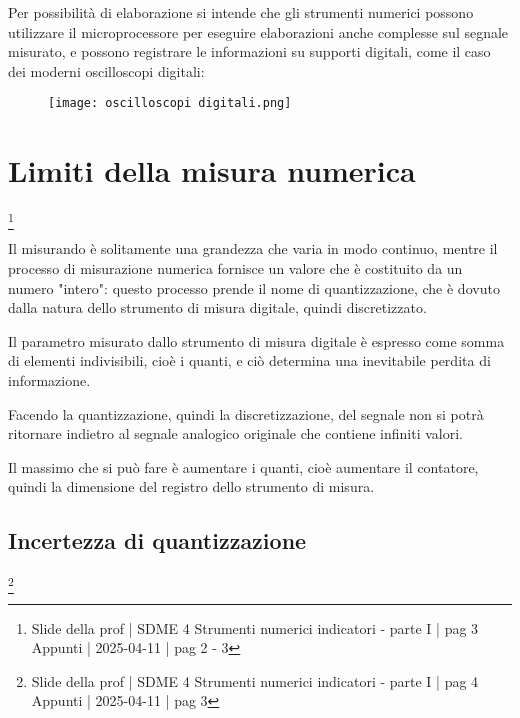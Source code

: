 Per possibilità di elaborazione si intende che gli strumenti numerici possono utilizzare il microprocessore per eseguire elaborazioni anche complesse 
sul segnale misurato, e possono registrare le informazioni su supporti digitali, come il caso 
dei moderni oscilloscopi digitali: 

\begin{figure}[h]
    \centering
    \texttt{[image: oscilloscopi digitali.png]}
\end{figure}

\newpage

\section{Limiti della misura numerica}
\footnote{Slide della prof | SDME 4 Strumenti numerici indicatori - parte I | pag 3 \\  
Appunti | 2025-04-11 | pag 2 - 3}

Il misurando è solitamente una grandezza che varia in modo continuo, mentre il processo di misurazione numerica 
fornisce un valore che è costituito da un numero "intero": questo processo prende il nome di quantizzazione, che è dovuto dalla natura dello strumento 
di misura digitale, quindi discretizzato. \newline 


Il parametro misurato dallo strumento di misura digitale è espresso come somma di elementi indivisibili, cioè i quanti, e ciò determina una inevitabile perdita di informazione. \newline 

Facendo la quantizzazione, quindi la discretizzazione, del segnale non si potrà ritornare indietro al segnale analogico originale che contiene infiniti valori. \newline 

Il massimo che si può fare è aumentare i quanti, cioè aumentare il contatore, quindi la dimensione del registro dello strumento di misura. \newline 

\newpage 

\subsection{Incertezza di quantizzazione}
\footnote{Slide della prof | SDME 4 Strumenti numerici indicatori - parte I | pag 4 \\  
Appunti | 2025-04-11 | pag 3}

